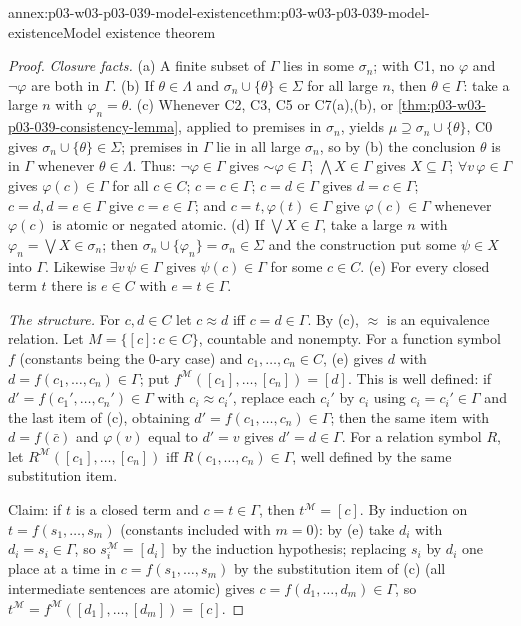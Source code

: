 \begin{annexitem}{annex:p03-w03-p03-039-model-existence}{thm:p03-w03-p03-039-model-existence}{Model existence theorem}
\begin{proof}
\emph{Closure facts.} (a) A finite subset of \(\Gamma\) lies in some
\(\sigma_n\); with C1, no \(\varphi\) and \(\neg\varphi\) are both in
\(\Gamma\). (b) If \(\theta\in\Lambda\) and \(\sigma_n\cup\{\theta\}\in\Sigma\)
for all large \(n\), then \(\theta\in\Gamma\): take a large \(n\) with
\(\varphi_n=\theta\). (c) Whenever C2, C3, C5 or C7(a),(b), or
\cref{thm:p03-w03-p03-039-consistency-lemma}, applied to premises in
\(\sigma_n\), yields \(\mu\supseteq\sigma_n\cup\{\theta\}\), C0 gives
\(\sigma_n\cup\{\theta\}\in\Sigma\); premises in \(\Gamma\) lie in all large
\(\sigma_n\), so by (b) the conclusion \(\theta\) is in \(\Gamma\) whenever
\(\theta\in\Lambda\). Thus: \(\neg\varphi\in\Gamma\) gives
\({\sim}\varphi\in\Gamma\); \(\bigwedge X\in\Gamma\) gives \(X\subseteq\Gamma\);
\(\forall v\,\varphi\in\Gamma\) gives \(\varphi(c)\in\Gamma\) for all
\(c\in C\); \(c=c\in\Gamma\); \(c=d\in\Gamma\) gives \(d=c\in\Gamma\);
\(c=d,d=e\in\Gamma\) give \(c=e\in\Gamma\); and \(c=t,\varphi(t)\in\Gamma\)
give \(\varphi(c)\in\Gamma\) whenever \(\varphi(c)\) is atomic or negated
atomic. (d) If \(\bigvee X\in\Gamma\), take a large \(n\) with
\(\varphi_n=\bigvee X\in\sigma_n\); then \(\sigma_n\cup\{\varphi_n\}=\sigma_n\in\Sigma\)
and the construction put some \(\psi\in X\) into \(\Gamma\). Likewise
\(\exists v\,\psi\in\Gamma\) gives \(\psi(c)\in\Gamma\) for some \(c\in C\).
(e) For every closed term \(t\) there is \(e\in C\) with \(e=t\in\Gamma\).

\emph{The structure.} For \(c,d\in C\) let \(c\approx d\) iff \(c=d\in\Gamma\).
By (c), \(\approx\) is an equivalence relation. Let \(M=\{[c]:c\in C\}\),
countable and nonempty. For a function symbol \(f\) (constants being the
\(0\)-ary case) and \(c_1,\ldots,c_n\in C\), (e) gives \(d\) with
\(d=f(c_1,\ldots,c_n)\in\Gamma\); put \(f^{\mathcal M}([c_1],\ldots,[c_n])=[d]\).
This is well defined: if \(d'=f(c_1',\ldots,c_n')\in\Gamma\) with
\(c_i\approx c_i'\), replace each \(c_i'\) by \(c_i\) using \(c_i=c_i'\in\Gamma\)
and the last item of (c), obtaining \(d'=f(c_1,\ldots,c_n)\in\Gamma\); then
the same item with \(d=f(\bar c)\) and \(\varphi(v)\) equal to \(d'=v\) gives
\(d'=d\in\Gamma\). For a relation symbol \(R\), let
\(R^{\mathcal M}([c_1],\ldots,[c_n])\) iff \(R(c_1,\ldots,c_n)\in\Gamma\),
well defined by the same substitution item.

Claim: if \(t\) is a closed term and \(c=t\in\Gamma\), then
\(t^{\mathcal M}=[c]\). By induction on \(t=f(s_1,\ldots,s_m)\) (constants
included with \(m=0\)): by (e) take \(d_i\) with \(d_i=s_i\in\Gamma\), so
\(s_i^{\mathcal M}=[d_i]\) by the induction hypothesis; replacing \(s_i\) by
\(d_i\) one place at a time in \(c=f(s_1,\ldots,s_m)\) by the substitution
item of (c) (all intermediate sentences are atomic) gives
\(c=f(d_1,\ldots,d_m)\in\Gamma\), so \(t^{\mathcal M}=f^{\mathcal M}([d_1],\ldots,[d_m])=[c]\).


\end{proof}
\end{annexitem}
